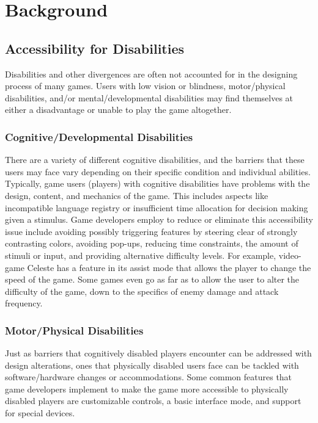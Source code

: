 \documentclass[10pt,twocolumn]{article}
\begin{document}
\section{Background}

\subsection{Accessibility for Disabilities}
    Disabilities and other divergences are often not accounted for in the designing process of many games. Users with low vision or blindness, motor/physical disabilities, and/or mental/developmental disabilities may find themselves at either a disadvantage or unable to play the game altogether.
\subsubsection{Cognitive/Developmental Disabilities}

    There are a variety of different cognitive disabilities, and the barriers that these users may face vary depending on their specific condition and individual abilities. \cite{torrente2014towards} Typically, game users (players) with cognitive disabilities have problems with the design, content, and mechanics of the game. \cite{torrente2014towards} This includes aspects like incompatible language registry or insufficient time allocation for decision making given a stimulus. Game developers employ to reduce or eliminate this accessibility issue include avoiding possibly triggering features by steering clear of strongly contrasting colors, avoiding pop-ups, reducing time constraints, the amount of stimuli or input, and providing alternative difficulty levels. \cite{torrente2014towards} For example, video-game Celeste has a feature in its assist mode that allows the player to change the speed of the game. Some games even go as far as to allow the user to alter the difficulty of the game, down to the specifics of enemy damage and attack frequency. 


\subsubsection{Motor/Physical Disabilities}
    Just as barriers that cognitively disabled players encounter can be addressed with design alterations, ones that physically disabled users face can be tackled with software/hardware changes or accommodations. Some common features that game developers implement to make the game more accessible to physically disabled players are customizable controls, a basic interface mode, and support for special devices. \cite{eskelinen2001gaming} 
\end{document}
